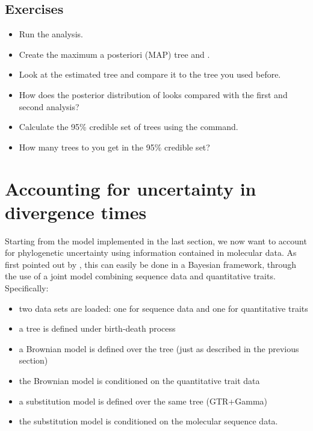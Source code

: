 \subsection*{Exercises}

\begin{itemize}
\item
Run the analysis.
\item
Create the maximum a posteriori (MAP) tree  and .
\item
Look at the estimated tree and compare it to the tree you used before.
\item 
How does the posterior distribution of  looks compared with the first and second analysis?
\item
Calculate the 95\% credible set of trees using the  command.
\item
How many trees to you get in the 95\% credible set?
\end{itemize}

\vspace{5cm}







\section{Accounting for uncertainty in divergence times}

Starting from the model implemented in the last section, we now want to account for phylogenetic uncertainty using information contained in molecular data. As first pointed out by \cite{Huelsenbeck:2003p999}, this can easily be done in a Bayesian framework, through the use of a joint model combining sequence data and quantitative traits. Specifically:
\begin{itemize}
\item
two data sets are loaded: one for sequence data and one for quantitative traits
\item
a tree is defined under birth-death process
\item
a Brownian model is defined over the tree (just as described in the previous section)
\item
the Brownian model is conditioned on the quantitative trait data
\item
a substitution model is defined over the same tree (GTR+Gamma)
\item
the substitution model is conditioned on the molecular sequence data.
\end{itemize}

